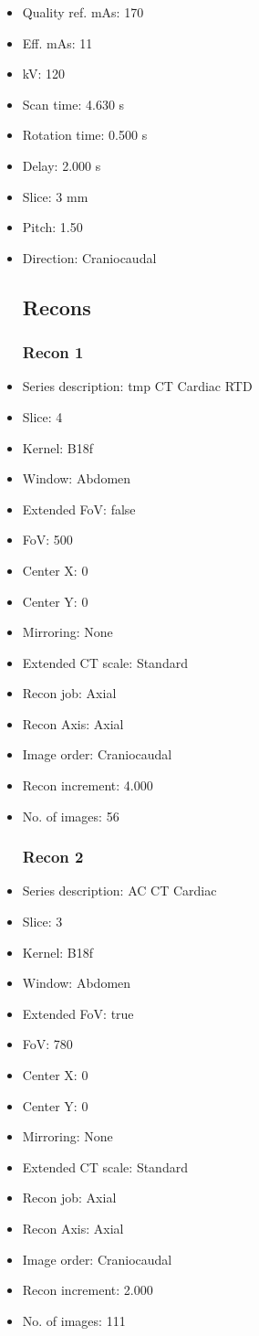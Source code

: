 \documentclass[12pt]{article}
\begin{document}
\begin{itemize}
\subsection{Scan}
\item Quality ref. mAs: 170\item Eff. mAs: 11\item kV: 120\item Scan time: 4.630 s\item Rotation time: 0.500 s\item Delay: 2.000 s\item Slice: 3 mm\item Pitch: 1.50\item Direction: Craniocaudal\subsection{Recons}

\subsubsection{Recon 1}
\item Series description: tmp CT Cardiac RTD
\item Slice: 4
\item Kernel: B18f
\item Window: Abdomen
\item Extended FoV: false
\item FoV: 500
\item Center X: 0
\item Center Y: 0
\item Mirroring: None
\item Extended CT scale: Standard
\item Recon job: Axial
\item Recon Axis: Axial
\item Image order: Craniocaudal
\item Recon increment: 4.000
\item No. of images: 56
\subsubsection{Recon 2}
\item Series description: AC CT Cardiac
\item Slice: 3
\item Kernel: B18f
\item Window: Abdomen
\item Extended FoV: true
\item FoV: 780
\item Center X: 0
\item Center Y: 0
\item Mirroring: None
\item Extended CT scale: Standard
\item Recon job: Axial
\item Recon Axis: Axial
\item Image order: Craniocaudal
\item Recon increment: 2.000
\item No. of images: 111

\end{itemize}
\end{document}
